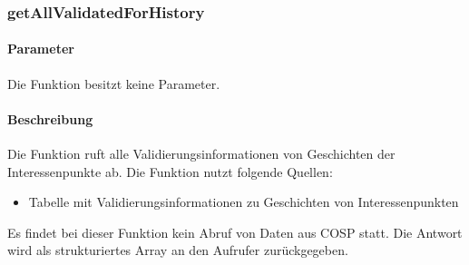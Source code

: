 \subsubsection{getAllValidatedForHistory}
\paragraph{Parameter} Die Funktion besitzt keine Parameter.
\paragraph{Beschreibung} Die Funktion ruft alle Validierungsinformationen von Geschichten der Interessenpunkte ab. Die Funktion nutzt folgende Quellen:
\begin{itemize}
	\item Tabelle mit Validierungsinformationen zu Geschichten von Interessenpunkten
\end{itemize}
Es findet bei dieser Funktion kein Abruf von Daten aus {\glqq COSP\grqq} statt. Die Antwort wird als strukturiertes Array an den Aufrufer zurückgegeben.
